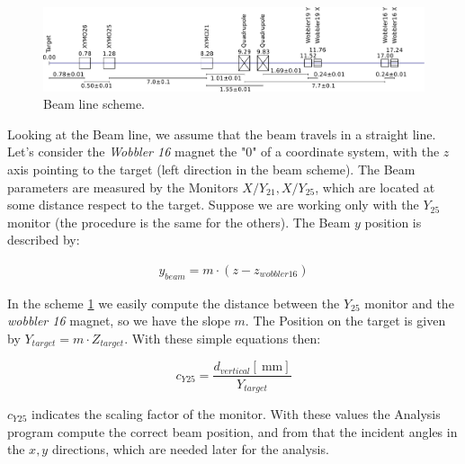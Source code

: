 \begin{figure}[hbtp]
\centering
\includegraphics[scale=0.4]{figures/XYMOCalibBeamLine.pdf}
\caption{Beam line scheme.}
\label{fig:BeamLine}
\end{figure}


Looking at the Beam line, we assume that the beam travels in a straight line. Let's consider the \textit{Wobbler 16} magnet the "$0$" of a coordinate system, with the $z$ axis pointing to the target (left direction in the beam scheme). The Beam parameters are measured by the Monitors $X/Y_{21}, X/Y_{25}$, which are located at some distance respect to the target. Suppose we are working only with the $Y_{25}$ monitor (the procedure is the same for the others). The Beam $y$ position is described by:

\begin{align*}
y_{beam} = m \cdot (z - z_{wobbler 16})
\end{align*}

In the scheme \ref{fig:BeamLine} we easily compute the distance between the $Y_{25}$ monitor and the \textit{wobbler 16} magnet, so we have the slope $m$. The Position on the target is given by $Y_{target} = m \cdot Z_{target}$. With these simple equations then:

\begin{equation}
c_{Y25} = \dfrac{d_{vertical} [\SI{}{\milli \meter}]}{ Y_{target}} 
\end{equation}

$c_{Y25}$ indicates the scaling factor of the monitor. With these values the Analysis program compute the correct beam position, and from that the incident angles in the $x,y$ directions, which are needed later for the analysis.


